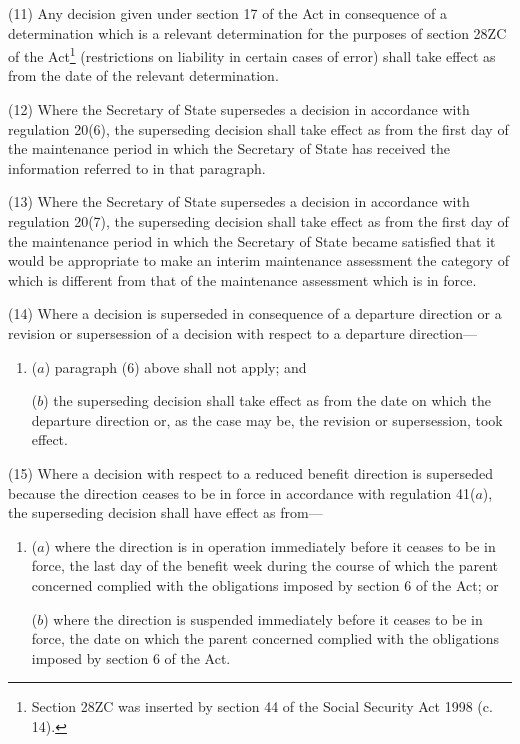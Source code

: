 \documentclass[a4paper,12pt]{article}
\begin{document}
(11) Any decision given under section 17 of the Act in consequence of a determination which is a relevant determination for the purposes of section 28ZC of the Act\footnote{\frenchspacing Section 28ZC was inserted by section 44 of the Social Security Act 1998 (c. 14).} (restrictions on liability in certain cases of error) shall take effect as from the date of the relevant determination.

(12) Where the Secretary of State supersedes a decision in accordance with regulation 20(6), the superseding decision shall take effect as from the first day of the maintenance period in which the Secretary of State has received the information referred to in that paragraph.

(13) Where the Secretary of State supersedes a decision in accordance with regulation 20(7), the superseding decision shall take effect as from the first day of the maintenance period in which the Secretary of State became satisfied that it would be appropriate to make an interim maintenance assessment the category of which is different from that of the maintenance assessment which is in force.

(14) Where a decision is superseded in consequence of a departure direction or a revision or supersession of a decision with respect to a departure direction---
\begin{enumerate}\item[]
($a$) paragraph (6) above shall not apply; and

($b$) the superseding decision shall take effect as from the date on which the departure direction or, as the case may be, the revision or supersession, took effect.
\end{enumerate}

(15) Where a decision with respect to a reduced benefit direction is superseded because the direction ceases to be in force in accordance with regulation 41($a$), the superseding decision shall have effect as from---
\begin{enumerate}\item[]
($a$) where the direction is in operation immediately before it ceases to be in force, the last day of the benefit week during the course of which the parent concerned complied with the obligations imposed by section 6 of the Act; or

($b$) where the direction is suspended immediately before it ceases to be in force, the date on which the parent concerned complied with the obligations imposed by section 6 of the Act.
\end{enumerate}
\end{document}
